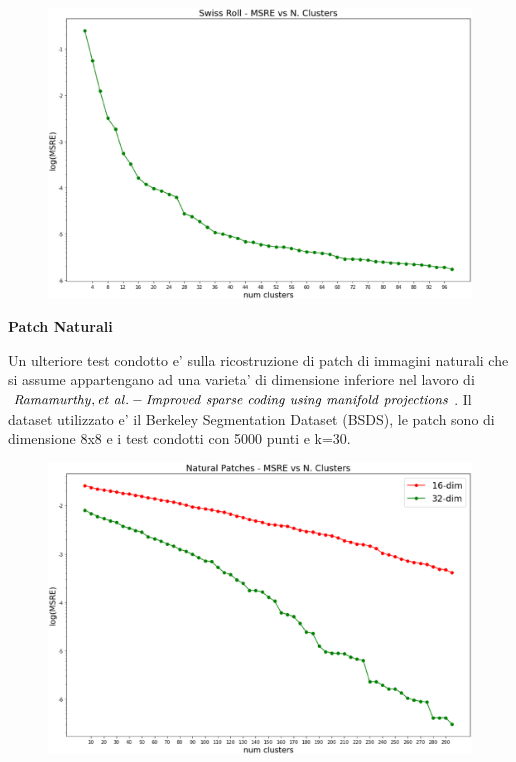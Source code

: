 \documentclass[a4, landscape]{seminar}
\theoremstyle{definition}
\def\bc{\begin{center}}
\def\ec{\end{center}}
\def\bs{\begin{slide}\begingroup\small}
\def\es{\endgroup\end{slide}}
\begin{document}
\bs
\begin{figure}[b]
\centering
\includegraphics[width=\textwidth]{swiss_msre.eps}
\end{figure}
\es

\bs
\bc{\bf\color{blue}Patch Naturali}\ec
Un ulteriore test condotto e' sulla ricostruzione di patch di immagini naturali che si
assume appartengano ad una varieta' di dimensione inferiore nel lavoro di $\it{Ramamurthy, et\ al. - Improved\ sparse\
coding\ using\ manifold\ projections}$. Il dataset utilizzato e' il Berkeley Segmentation Dataset (BSDS),
le patch sono di dimensione 8x8 e i test condotti con 5000 punti e k=30.
\es

\bs
\begin{figure}[b]
\centering
\includegraphics[width=\textwidth]{naturalpatches.eps}
\end{figure}
\es
\end{document}
